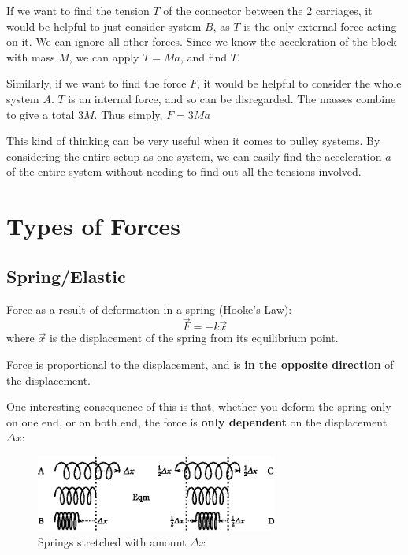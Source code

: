 \documentclass[11pt]{article}
\numberwithin{equation}{section}
\begin{document}
	If we want to find the tension $T$ of the connector between the 2 carriages, it would be helpful to just consider system $B$, as $T$ is the only external force acting on it. We can ignore all other forces. Since we know the acceleration of the block with mass $M$, we can apply $T=Ma$, and find $T$.
	
	Similarly, if we want to find the force $F$, it would be helpful to consider the whole system $A$. $T$ is an internal force, and so can be disregarded. The masses combine to give a total $3M$. Thus simply, $F = 3Ma$
	
	This kind of thinking can be very useful when it comes to pulley systems. By considering the entire setup as one system, we can easily find the acceleration $a$ of the entire system without needing to find out all the tensions involved.
	
	\section{Types of Forces}
		\subsection{Spring/Elastic}
		\begin{shaded}
			Force as a result of deformation in a spring (Hooke's Law):
				\begin{equation}
				\vec{F}=-k\vec{x}
				\end{equation}
				where $\vec{x}$ is the displacement of the spring from its equilibrium point.
		\end{shaded}
		Force is proportional to the displacement, and is \textbf{in the opposite direction} of the displacement.
		
		One interesting consequence of this is that, whether you deform the spring only on one end, or on both end, the force is \textbf{only dependent} on the displacement $\Delta x$:
		
		\begin{figure}[h]
			\centering
			\includegraphics[height=2.5cm]{springs.eps}
			\caption{Springs stretched with amount $\Delta x$}
			\label{fig:springs}
		\end{figure}
	
\end{document}
